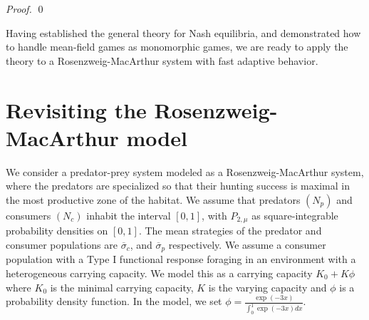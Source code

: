 \begin{proof}
  \begin{comment}so is $-MdU$ for any $M$. Define the projection $\Pi$ from $H$ to $P_{2,\mu}$. Then the dynamical system
  \begin{equation}
    \dot{\sigma}_i = \Pi(-dU_i((\sigma)_{i=1}^M)))
  \end{equation}
  converges asymptotically to the Nash equilibrium \citep{}. The population dynamical system with instantanous Nash equilibrium is then equivalent to the system:
  \begin{equation}
    \label{eq:instant_nash_DE}
    \dot{N_i} = N_i f_i
    \lim_{\epsilon \to 0}\epsilon\dot{\sigma}_i = \Pi(-dU_i((\sigma)_{i=1}^M)))
  \end{equation}
  Since the first set of equations stays in the positive orthant where can introduce the projection operator $\Pi_R$, the system can be rewritten as
  \begin{equation}
    \dot{N_i} = \Pi_R(-(-N_i f_i))
    \epsilon\dot{\sigma}_i = \Pi(-dU_i((\sigma)_{i=1}^M)))
  \end{equation}
  This system converges asymptotically if the operator
  \begin{equation}
    \label{eq:de_sys}
    (-N_i f_i)_{i=1}^M \osum (\frac{1}{\epsilon}-dU)
  \end{equation}
  is strictly pseudomonotone. If there exists an $N$ such that \Cref{eq:de_sys} is strictly pseudomonotone, hence asymptotically stable, for all $\frac{1}{\epsilon}>N$, then \Cref{eq:instant_nash_DE} is also asymptotically stable.

\end{comment}
    \qed

\end{proof}
Having established the general theory for Nash equilibria, and demonstrated how to handle mean-field games as monomorphic games, we are ready to apply the theory to a Rosenzweig-MacArthur system with fast adaptive behavior.
\section{Revisiting the Rosenzweig-MacArthur model}
\label{sec:model_rm}
We consider a predator-prey system modeled as a Rosenzweig-MacArthur system, where the predators are specialized so that their hunting success is maximal in the most productive zone of the habitat.
We assume that predators $(N_p)$ and consumers $(N_c)$ inhabit the interval $[0,1]$, with $P_{2,\mu}$ as square-integrable probability densities on $[0,1]$. The mean strategies of the predator and consumer populations are $\overbar{\sigma}_c$, and $\overbar{\sigma}_p$ respectively. We assume a consumer population with a Type I functional response foraging in an environment with a heterogeneous carrying capacity. We model this as a carrying capacity $K_0 + K \phi$ where $K_0$ is the minimal carrying capacity, $K$ is the varying capacity and $\phi$ is a probability density function. In the model, we set  $\phi = \frac{\exp(-3 x)}{\int_0^1 \exp(-3 x) dx}$.

